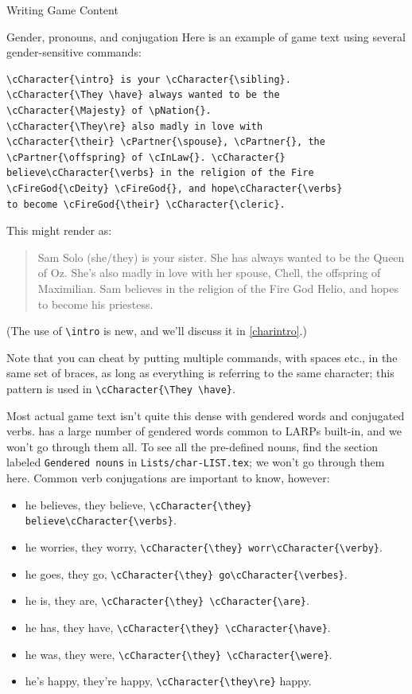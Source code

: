 \documentclass[sheet]{GameTexBase}
\newcommand{\pronounfile}{\lstinline|Lists/char-LIST.tex|}
\begin{document}
\begin{section}{Writing Game Content}
\begin{subsection}{Gender, pronouns, and conjugation}
Here is an example of game text using several gender-sensitive commands:

\begin{verbatim}
\cCharacter{\intro} is your \cCharacter{\sibling}.
\cCharacter{\They \have} always wanted to be the
\cCharacter{\Majesty} of \pNation{}.  
\cCharacter{\They\re} also madly in love with 
\cCharacter{\their} \cPartner{\spouse}, \cPartner{}, the 
\cPartner{\offspring} of \cInLaw{}. \cCharacter{} 
believe\cCharacter{\verbs} in the religion of the Fire
\cFireGod{\cDeity} \cFireGod{}, and hope\cCharacter{\verbs}
to become \cFireGod{\their} \cCharacter{\cleric}.
\end{verbatim} 

This might render as:

\begin{quote}
Sam Solo (she/they) is your sister.  She has always wanted to be the Queen of Oz.  She's also madly in love with her spouse, Chell, the offspring of Maximilian.  Sam believes in the religion of the Fire God Helio, and hopes to become his priestess.
\end{quote}

(The use of \lstinline|\intro| is new, and we'll discuss it in \ref{charintro}.)

Note that you can cheat by putting multiple commands, with spaces etc., in the same set of braces, as long as everything is referring to the same character; this pattern is used in \lstinline|\cCharacter{\They \have}|.

Most actual game text isn't quite this dense with gendered words and conjugated verbs.  \gametex{} has a large number of gendered words common to LARPs built-in, and we won't go through them all.
To see all the pre-defined nouns, find the section labeled \texttt{Gendered nouns} in \pronounfile{}; we won't go through them here.  Common verb conjugations are important to know, however:

\begin{itemize}
\item he believes, they believe, \lstinline|\cCharacter{\they} believe\cCharacter{\verbs}|.
\item he worries, they worry, \lstinline|\cCharacter{\they} worr\cCharacter{\verby}|.
\item he goes, they go, \lstinline|\cCharacter{\they} go\cCharacter{\verbes}|.
\item he is, they are, \lstinline|\cCharacter{\they} \cCharacter{\are}|.
\item he has, they have, \lstinline|\cCharacter{\they} \cCharacter{\have}|.
\item he was, they were, \lstinline|\cCharacter{\they} \cCharacter{\were}|.
\item he's happy, they're happy, \lstinline|\cCharacter{\they\re}| happy.
\end{itemize}


\end{subsection}
\end{section}
\end{document}
